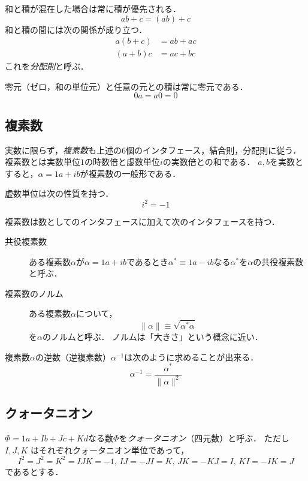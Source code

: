\documentclass{jsbook}
\newcommand{\keyword}[1]{\emph{#1}}
\newcommand{\ii}{I}%
\newcommand{\jj}{J}%
\newcommand{\kk}{K}%
\newcommand{\im}{i}%
\newcommand{\norm}[1]{\|{#1}\|}
\begin{document}
和と積が混在した場合は常に積が優先される．
\begin{equation}
ab+c=(ab)+c
\end{equation}
和と積の間には次の関係が成り立つ．
\begin{align}
a(b+c)&=ab+ac\\
(a+b)c&=ac+bc
\end{align}
これを\keyword{分配則}と呼ぶ．

零元（ゼロ，和の単位元）と任意の元との積は常に零元である．
\begin{equation}
0 a=a0 =0
\end{equation}

\subsection{複素数}

実数に限らず，\keyword{複素数}も上述の6個のインタフェース，結合則，分配則に従う．
複素数とは実数単位$1$の時数倍と虚数単位$\im$の実数倍との和である．
$a,b$を実数とすると，$\alpha=1 a+\im b$が複素数の一般形である．

虚数単位は次の性質を持つ．
\begin{equation}
\im^2=-1
\end{equation}

複素数は数としてのインタフェースに加えて次のインタフェースを持つ．
\begin{description}
\item[共役複素数] ある複素数$\alpha$が$\alpha=1 a+\im b$であるとき$\alpha^*\equiv1 a-\im b$なる$\alpha^*$を$\alpha$の共役複素数と呼ぶ．
\item[複素数のノルム] ある複素数$\alpha$について，
\begin{equation}
\norm{\alpha}\equiv\sqrt{\alpha^*\alpha}
\end{equation}
を$\alpha$のノルムと呼ぶ．
ノルムは「大きさ」という概念に近い．
\end{description}

複素数$\alpha$の逆数（逆複素数）$\alpha^{-1}$は次のように求めることが出来る．
\begin{equation}
\alpha^{-1}=\frac{\alpha^*}{\norm{\alpha}^2}
\end{equation}

\subsection{クォータニオン}

$\varPhi=1 a+\ii b+\jj c+\kk d$なる数$\varPhi$を\keyword{クォータニオン}（四元数）と呼ぶ．
ただし $\ii,\jj,\kk$ はそれぞれクォータニオン単位であって，
\begin{equation}
\ii^2=\jj^2=\kk^2=\ii\jj\kk=-1,\,
\ii\jj=-\jj\ii=\kk,\,
\jj\kk=-\kk\jj=\ii,\,
\kk\ii=-\ii\kk=\jj
\end{equation}
であるとする．
\end{document}
